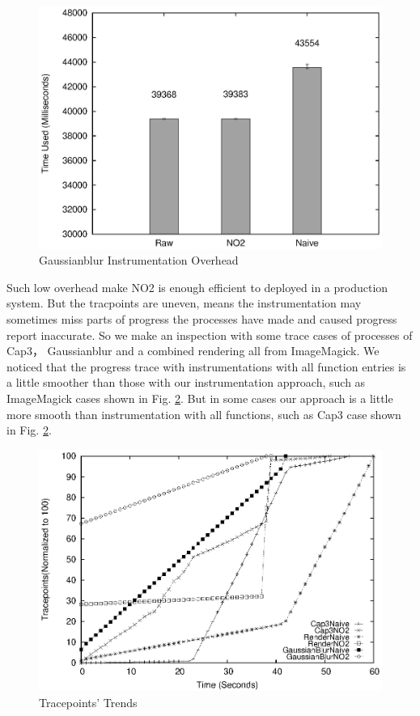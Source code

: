 \begin{figure}
\centering
  \includegraphics[width=0.9\columnwidth]{figures/overhead_gaussianblur.eps}
\caption{Gaussianblur Instrumentation Overhead}
\label{figure:overhead_gaussianblur}
\end{figure}

Such low overhead make NO2 is enough efficient to deployed in a production system. But the tracpoints are uneven, means the instrumentation may sometimes miss parts of progress the processes have made and caused progress report inaccurate. So we make an inspection with some trace cases of processes of Cap3， Gaussianblur and a combined rendering all from ImageMagick. We noticed that the progress trace with instrumentations with all function entries is a little smoother than those with our instrumentation approach, such as ImageMagick cases shown in Fig. \ref{figure:tracepoints}. But in some cases our approach is a little more smooth than instrumentation with all functions, such as Cap3 case shown in Fig. \ref{figure:tracepoints}.

\begin{figure}
\centering
\includegraphics[width=0.9\columnwidth]{figures/tracepoints_all_vs_sampling.eps}
\caption{Tracepoints' Trends}
\label{figure:tracepoints}
\end{figure}

